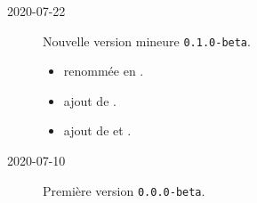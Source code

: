 \documentclass[12pt,a4paper]{article}
\begin{document}
\begin{description}
    \separation

    \medskip
    \item[2020-07-22] Nouvelle version mineure \verb+0.1.0-beta+.
    
    \begin{itemize}[itemsep=.5em]
        \item {}
               renommée en  .
    
        \item {}
              ajout de .
    
        \item {}
              ajout de  et .
    \end{itemize}
    
    \separation

    \medskip
    \item[2020-07-10] Première version \verb+0.0.0-beta+.

\end{description}
\end{document}
